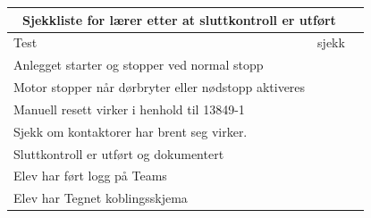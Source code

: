 \begin{center}
\begin{tabular}{ | m{8cm} | m{1cm}| m{2cm} | } 
\hline
\multicolumn{2}{|c|}{Sjekkliste for lærer etter at sluttkontroll er utført} \\
\hline
Test	& sjekk \\ 
\hline
\hline

	Anlegget starter og stopper ved normal stopp &\\
	
	\hline
	Motor stopper når dørbryter eller nødstopp aktiveres&\\
	\hline
	Manuell resett virker i henhold til 13849-1 &\\
	\hline
	Sjekk om kontaktorer har brent seg virker. &\\
	\hline
	Sluttkontroll er utført og dokumentert &\\
	\hline
	Elev har ført logg på Teams&\\
	\hline
	Elev har Tegnet koblingsskjema &\\
	\hline

\end{tabular}
\end{center}
\vskip 10pt 















\vfil \eject

















